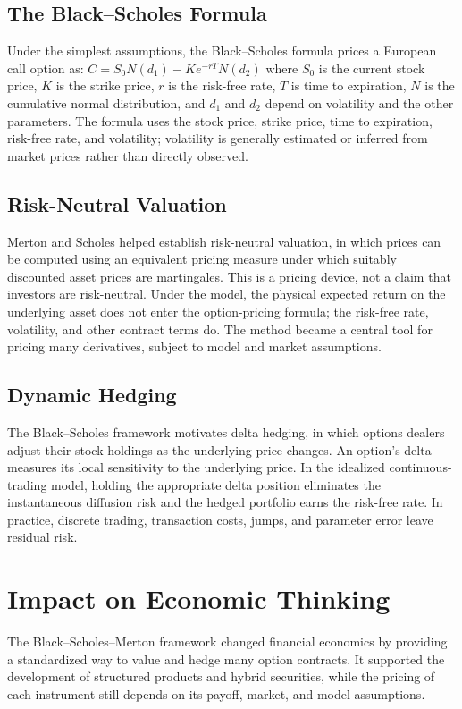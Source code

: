 \subsection*{The Black--Scholes Formula}
Under the simplest assumptions, the Black--Scholes formula prices a European call
option as:
$C = S_0 N(d_1) - K e^{-rT} N(d_2)$
where $S_0$ is the current stock price, $K$ is the strike price, $r$ is the risk-free
rate, $T$ is time to expiration, $N$ is the cumulative normal distribution, and
$d_1$ and $d_2$ depend on volatility and the other parameters. The formula uses
the stock price, strike price, time to expiration, risk-free rate, and volatility;
volatility is generally estimated or inferred from market prices rather than
directly observed.

\subsection*{Risk-Neutral Valuation}
Merton and Scholes helped establish risk-neutral valuation, in which prices can
be computed using an equivalent pricing measure under which suitably discounted
asset prices are martingales. This is a pricing device, not a claim that investors
are risk-neutral. Under the model, the physical expected return on the underlying
asset does not enter the option-pricing formula; the risk-free rate, volatility,
and other contract terms do. The method became a central tool for pricing many
derivatives, subject to model and market assumptions.

\subsection*{Dynamic Hedging}
The Black--Scholes framework motivates delta hedging, in which options dealers
adjust their stock holdings as the underlying price changes. An option's delta
measures its local sensitivity to the underlying price. In the idealized
continuous-trading model, holding the appropriate delta position eliminates the
instantaneous diffusion risk and the hedged portfolio earns the risk-free rate.
In practice, discrete trading, transaction costs, jumps, and parameter error
leave residual risk.

\section{Impact on Economic Thinking}
The Black--Scholes--Merton framework changed financial economics by providing a
standardized way to value and hedge many option contracts. It supported the
development of structured products and hybrid securities, while the pricing of
each instrument still depends on its payoff, market, and model assumptions.

